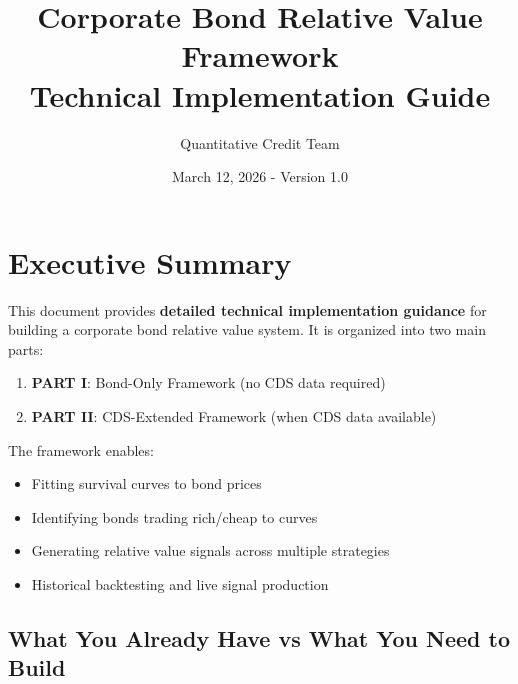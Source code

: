 \documentclass[11pt,a4paper]{article}
\title{\textbf{Corporate Bond Relative Value Framework}\\
\large Technical Implementation Guide}
\author{Quantitative Credit Team}
\date{March 12, 2026 - Version 1.0}
\begin{document}
\maketitle

\tableofcontents
\newpage

\section{Executive Summary}

\begin{keybox}
This document provides \textbf{detailed technical implementation guidance} for building a corporate bond relative value system. It is organized into two main parts:

\begin{enumerate}
    \item \textbf{PART I}: Bond-Only Framework (no CDS data required)
    \item \textbf{PART II}: CDS-Extended Framework (when CDS data available)
\end{enumerate}

The framework enables:
\begin{itemize}
    \item Fitting survival curves to bond prices
    \item Identifying bonds trading rich/cheap to curves
    \item Generating relative value signals across multiple strategies
    \item Historical backtesting and live signal production
\end{itemize}
\end{keybox}

\subsection{What You Already Have vs What You Need to Build}
\end{document}
